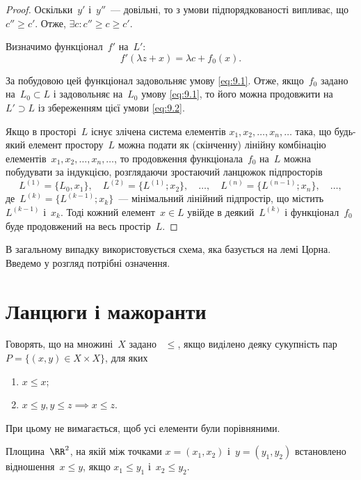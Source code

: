\begin{proof}
Оскільки~$y'$ і~$y''$~--- довільні, то з умови підпорядкованості
випливає, що~$c'' \ge c'$. Отже, $\exists c: c'' \ge c \ge c'$.

Визначимо функціонал~$f'$ на~$L'$:
\begin{equation*}
    f'(\lambda z + x) = \lambda c + f_0(x).
\end{equation*}

За побудовою цей функціонал задовольняє умову \eqref{eq:9.1}. Отже,
якщо~$f_0$ задано на~$L_0 \subset L$ і задовольняє на~$L_0$ умову \eqref{eq:9.1}, то
його можна продовжити на~$L' \supset L$ із збереженням цієї умови \eqref{eq:9.2}.

Якщо в просторі~$L$ існує злічена система елементів
$x_1, x_2, \dots, x_n, \dots$ така, що будь-який елемент простору~$L$ можна
подати як (скінченну) лінійну комбінацію елементів~$x_1, x_2, \dots, x_n, \dots$, то
продовження функціонала~$f_0$ на~$L$ можна побудувати за
індукцією, розглядаючи зростаючий ланцюжок підпросторів
\begin{equation*}
    L^{(1)} = \{L_0, x_1\}, \quad L^{(2)} = \{L^{(1)}; x_2\}, \quad \dots, \quad L^{(n)} = \{L^{(n - 1)}; x_n\}, \quad \dots,
\end{equation*}
де~$L^{(k)} = \{L^{(k - 1)}; x_k\}$~--- мінімальний лінійний підпростір, що
містить~$L^{(k - 1)}$ і~$x_k$. Тоді кожний елемент~$x \in L$ увійде в
деякий~$L^{(k)}$ і функціонал~$f_0$ буде продовжений на весь
простір~$L$. 
\end{proof}

В загальному випадку використовується схема,
яка базується на лемі Цорна. Введемо у розгляд потрібні
означення.

\section{Ланцюги і мажоранти}

\begin{definition}
Говорять, що на множині~$X$ задано ~$\le$, якщо виділено деяку сукупність пар
$P = \{(x, y) \in X \times X\}$, для яких
\begin{enumerate}
    \item $x \le x$;
    \item $x \le y, y \le z \implies x \le z$.
\end{enumerate}
При цьому не вимагається, щоб усі елементи були порівняними.
\end{definition}

\begin{example}
Площина~$\RR^2$, на якій між точками
$x = (x_1, x_2)$ і~$y = (y_1, y_2)$
встановлено відношення~$x \le y$, якщо
$x_1 \le y_1$ і~$x_2 \le y_2$.
\end{example}

